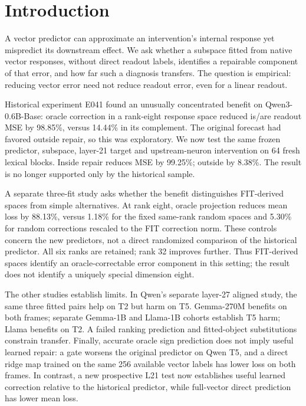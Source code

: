 
\section{Introduction}
A vector predictor can approximate an intervention's internal response yet mispredict its downstream effect. We ask whether a subspace fitted from native vector responses, without direct readout labels, identifies a repairable component of that error, and how far such a diagnosis transfers. The question is empirical: reducing vector error need not reduce readout error, even for a linear readout.

Historical experiment E041 found an unusually concentrated benefit on Qwen3-0.6B-Base: oracle correction in a rank-eight response space reduced is/are readout MSE by 98.85\%, versus 14.44\% in its complement. The original forecast had favored outside repair, so this was exploratory. We now test the same frozen predictor, subspace, layer-21 target and upstream-neuron intervention on 64 fresh lexical blocks. Inside repair reduces MSE by 99.25\%; outside by 8.38\%. The result is no longer supported only by the historical sample.

A separate three-fit study asks whether the benefit distinguishes FIT-derived spaces from simple alternatives. At rank eight, oracle projection reduces mean loss by 88.13\%, versus 1.18\% for the fixed same-rank random spaces and 5.30\% for random corrections rescaled to the FIT correction norm. These controls concern the new predictors, not a direct randomized comparison of the historical predictor. All six ranks are retained; rank 32 improves further. Thus FIT-derived spaces identify an oracle-correctable error component in this setting; the result does not identify a uniquely special dimension eight.

The other studies establish limits. In Qwen's separate layer-27 aligned study, the same three fitted pairs help on T2 but harm on T5. Gemma-270M benefits on both frames; separate Gemma-1B and Llama-1B cohorts establish T5 harm; Llama benefits on T2. A failed ranking prediction and fitted-object substitutions constrain transfer. Finally, accurate oracle sign prediction does not imply useful learned repair: a gate worsens the original predictor on Qwen T5, and a direct ridge map trained on the same 256 available vector labels has lower loss on both frames. In contrast, a new prospective L21 test now establishes useful learned correction relative to the historical predictor, while full-vector direct prediction has lower mean loss.

